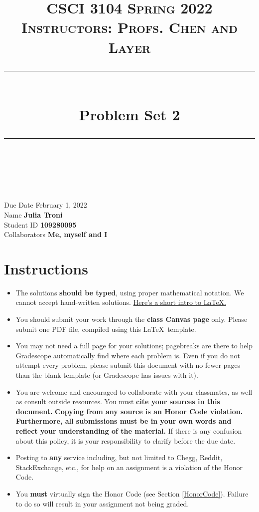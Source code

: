 \documentclass[11pt]{article}
\title{
\normalfont \normalsize 
\textsc{CSCI 3104 Spring 2022 \\ 
Instructors: Profs. Chen and Layer} \\
[10pt] 
\rule{\linewidth}{0.5pt} \\[6pt] 
\huge Problem Set 2 \\
\rule{\linewidth}{2pt}  \\[10pt]
}
\date{}
\theoremstyle{definition}
\theoremstyle{definition}
\theoremstyle{definition}
\begin{document}

\maketitle


\noindent
Due Date \dotfill February 1, 2022 \\
Name \dotfill \textbf{Julia Troni} \\
Student ID \dotfill \textbf{109280095} \\
Collaborators \dotfill \textbf{Me, myself and I}

\tableofcontents

\section{Instructions}
 \begin{itemize}
	\item The solutions \textbf{should be typed}, using proper mathematical notation. We cannot accept hand-written solutions. \href{http://ece.uprm.edu/~caceros/latex/introduction.pdf}{Here's a short intro to \LaTeX.}
	\item You should submit your work through the \textbf{class Canvas page} only. Please submit one PDF file, compiled using this \LaTeX \ template.
	\item You may not need a full page for your solutions; pagebreaks are there to help Gradescope automatically find where each problem is. Even if you do not attempt every problem, please submit this document with no fewer pages than the blank template (or Gradescope has issues with it).

	\item You are welcome and encouraged to collaborate with your classmates, as well as consult outside resources. You must \textbf{cite your sources in this document.} \textbf{Copying from any source is an Honor Code violation. Furthermore, all submissions must be in your own words and reflect your understanding of the material.} If there is any confusion about this policy, it is your responsibility to clarify before the due date. 

	\item Posting to \textbf{any} service including, but not limited to Chegg, Reddit, StackExchange, etc., for help on an assignment is a violation of the Honor Code.

	\item You \textbf{must} virtually sign the Honor Code (see Section \ref{HonorCode}). Failure to do so will result in your assignment not being graded.
\end{itemize}
\end{document}
